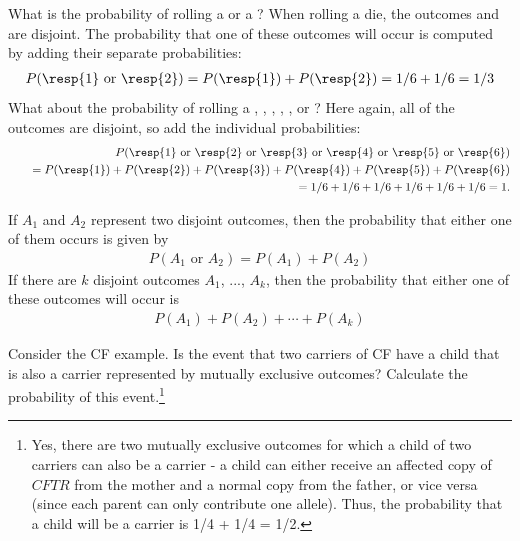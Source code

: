 What is the probability of rolling a  or a ? When rolling a die, the outcomes  and  are disjoint. The probability that one of these outcomes will occur is computed by adding their separate probabilities:
\begin{eqnarray*}
P(\text{\resp{1} or \resp{2}}) = P(\text{\resp{1}})+P(\text{\resp{2}}) = 1/6 + 1/6 = 1/3
\end{eqnarray*}
What about  the probability of rolling a , , , , , or ? Here again, all of the outcomes are disjoint, so add the individual probabilities:
\begin{eqnarray*}
&&P(\text{\resp{1} or \resp{2} or \resp{3} or \resp{4} or \resp{5} or \resp{6}}) \\
	&&\quad= P(\text{\resp{1}})+P(\text{\resp{2}})+P(\text{\resp{3}})+P(\text{\resp{4}})+P(\text{\resp{5}})+P(\text{\resp{6}}) \\
	&&\quad= 1/6 + 1/6 + 1/6 + 1/6 + 1/6 + 1/6 = 1.
\end{eqnarray*}

\begin{termBox}{ If $A_1$ and $A_2$ represent two disjoint outcomes, then the probability that either one of them occurs is given by
\begin{eqnarray*}
P(A_1\text{ or } A_2) = P(A_1) + P(A_2)
\end{eqnarray*}
If there are $k$ disjoint outcomes $A_1$, ..., $A_k$, then the probability that either one of these outcomes will occur is
\begin{eqnarray}
P(A_1) + P(A_2) + \cdots + P(A_k)
\end{eqnarray}
}
\end{termBox}


\begin{exercise}
	Consider the CF example. Is the event that two carriers of CF have a child that is also a carrier represented by mutually exclusive outcomes? Calculate the probability of this event.\footnote{Yes, there are two mutually exclusive outcomes for which a child of two carriers can also be a carrier - a child can either receive an affected copy of $CFTR$ from the mother and a normal copy from the father, or vice versa (since each parent can only contribute one allele). Thus, the probability that a child will be a carrier is 1/4 + 1/4 = 1/2.}
\end{exercise}

